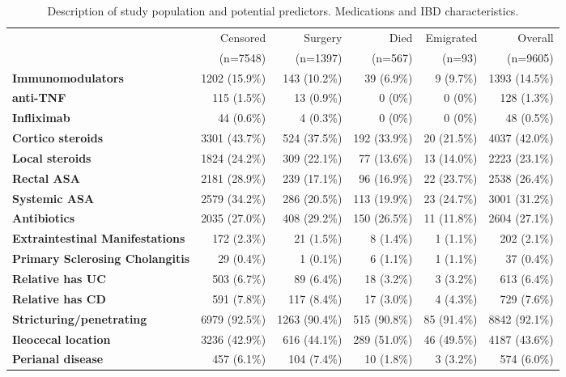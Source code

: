 \documentclass{statsoc}
\begin{document}
\begin{table}
\caption{Description of study population and potential predictors. Medications and IBD characteristics. \label{tab1b}} 
\centering
\begin{tabular}{lrrrrr}
\hline
& Censored & Surgery & Died & Emigrated &  Overall \\
& (n=7548) & (n=1397) & (n=567) & (n=93) & (n=9605) \\
\hline
\textbf{Immunomodulators} &  1202 (15.9\%) & 143 (10.2\%) & 39 (6.9\%) & 9 (9.7\%) & 1393 (14.5\%) \\
\textbf{anti-TNF}  & 115 (1.5\%) & 13 (0.9\%) & 0 (0\%) & 0 (0\%) & 128 (1.3\%) \\
\textbf{Infliximab}  & 44 (0.6\%) & 4 (0.3\%) & 0 (0\%) & 0 (0\%) & 48 (0.5\%) \\
\textbf{Cortico steroids} & 3301 (43.7\%) & 524 (37.5\%) & 192 (33.9\%) & 20 (21.5\%) & 4037 (42.0\%) \\
\textbf{Local steroids} & 1824 (24.2\%) & 309 (22.1\%) & 77 (13.6\%) & 13 (14.0\%) & 2223 (23.1\%) \\
\textbf{Rectal ASA}  & 2181 (28.9\%) & 239 (17.1\%) & 96 (16.9\%) & 22 (23.7\%) & 2538 (26.4\%) \\
\textbf{Systemic ASA}  & 2579 (34.2\%) & 286 (20.5\%) & 113 (19.9\%) & 23 (24.7\%) & 3001 (31.2\%) \\
\textbf{Antibiotics}  & 2035 (27.0\%) & 408 (29.2\%) & 150 (26.5\%) & 11 (11.8\%) & 2604 (27.1\%) \\
\textbf{Extraintestinal Manifestations} & 172 (2.3\%) & 21 (1.5\%) & 8 (1.4\%) & 1 (1.1\%) & 202 (2.1\%) \\
\textbf{Primary Sclerosing Cholangitis}  & 29 (0.4\%) & 1 (0.1\%) & 6 (1.1\%) & 1 (1.1\%) & 37 (0.4\%) \\
\textbf{Relative has UC}  & 503 (6.7\%) & 89 (6.4\%) & 18 (3.2\%) & 3 (3.2\%) & 613 (6.4\%) \\
\textbf{Relative has CD}  & 591 (7.8\%) & 117 (8.4\%) & 17 (3.0\%) & 4 (4.3\%) & 729 (7.6\%) \\
\textbf{Stricturing/penetrating} & 6979 (92.5\%) & 1263 (90.4\%) & 515 (90.8\%) & 85 (91.4\%) & 8842 (92.1\%) \\
\textbf{Ileocecal location}  & 3236 (42.9\%) & 616 (44.1\%) & 289 (51.0\%) & 46 (49.5\%) & 4187 (43.6\%) \\
\textbf{Perianal disease}  & 457 (6.1\%) & 104 (7.4\%) & 10 (1.8\%) & 3 (3.2\%) & 574 (6.0\%) \\
\hline
\end{tabular}
\end{table}
\end{document}
